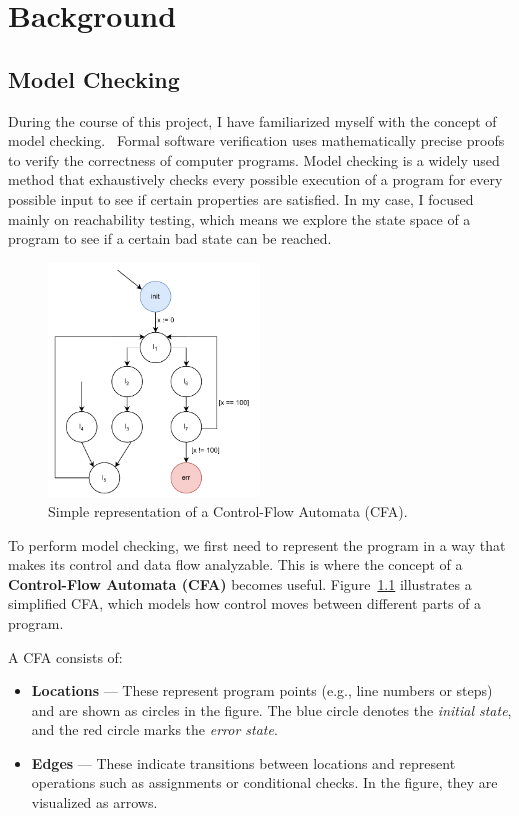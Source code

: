 \chapter{Background}

\section{Model Checking}
During the course of this project, I have familiarized myself with the concept of model checking.~\cite{modelChecking}
Formal software verification uses mathematically precise proofs to verify the correctness of computer programs. Model checking is a widely used method that exhaustively checks every possible execution of a program for every possible input to see if certain properties are satisfied.
In my case, I focused mainly on reachability testing, which means we explore the state space of a program to see if a certain bad state can be reached.

\begin{figure}[h]
  \centering
  \includegraphics[width=0.5\textwidth]{figures/cfa_simple.pdf}
  \caption{Simple representation of a Control-Flow Automata (CFA).}
  \label{fig:cfa}
\end{figure}

To perform model checking, we first need to represent the program in a way that makes its control and data flow analyzable. This is where the concept of a \textbf{Control-Flow Automata (CFA)} becomes useful. Figure~\ref{fig:cfa} illustrates a simplified CFA, which models how control moves between different parts of a program.

A CFA consists of:
\begin{itemize}
  \item \textbf{Locations} — These represent program points (e.g., line numbers or steps) and are shown as circles in the figure. The blue circle denotes the \textit{initial state}, and the red circle marks the \textit{error state}.
  \item \textbf{Edges} — These indicate transitions between locations and represent operations such as assignments or conditional checks. In the figure, they are visualized as arrows.
\end{itemize}

